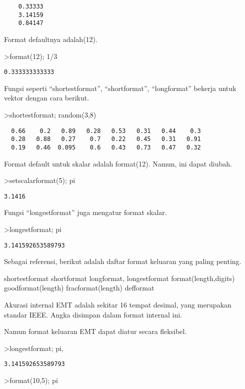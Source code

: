 \documentclass[
]{book}
\begin{document}
\begin{verbatim}
    0.33333 
    3.14159 
    0.84147 
\end{verbatim}

Format defaultnya adalah(12).

\textgreater format(12); 1/3

\begin{verbatim}
0.333333333333
\end{verbatim}

Fungsi seperti ``shortestformat'', ``shortformat'', ``longformat'' bekerja untuk vektor dengan cara berikut.

\textgreater shortestformat; random(3,8)

\begin{verbatim}
  0.66    0.2   0.89   0.28   0.53   0.31   0.44    0.3 
  0.28   0.88   0.27    0.7   0.22   0.45   0.31   0.91 
  0.19   0.46  0.095    0.6   0.43   0.73   0.47   0.32 
\end{verbatim}

Format default untuk skalar adalah format(12). Namun, ini dapat diubah.

\textgreater setscalarformat(5); pi

\begin{verbatim}
3.1416
\end{verbatim}

Fungsi ``longestformat'' juga mengatur format skalar.

\textgreater longestformat; pi

\begin{verbatim}
3.141592653589793
\end{verbatim}

Sebagai referensi, berikut adalah daftar format keluaran yang paling penting.

shortestformat shortformat longformat, longestformat format(length,digits) goodformat(length) fracformat(length) defformat

Akurasi internal EMT adalah sekitar 16 tempat desimal, yang merupakan standar IEEE. Angka disimpan dalam format internal ini.

Namun format keluaran EMT dapat diatur secara fleksibel.

\textgreater longestformat; pi,

\begin{verbatim}
3.141592653589793
\end{verbatim}

\textgreater format(10,5); pi
\end{document}
